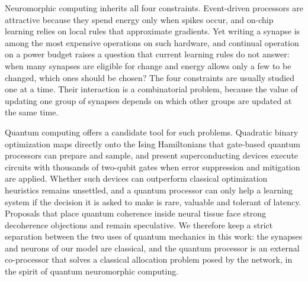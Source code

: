 \documentclass[12pt,a4paper]{article}
\begin{document}
Neuromorphic computing inherits all four constraints. Event-driven processors are attractive because they spend energy only when spikes occur\cite{roy2019,davies2018}, and on-chip learning relies on local rules that approximate gradients\cite{bellec2020,neftci2019}. Yet writing a synapse is among the most expensive operations on such hardware, and continual operation on a power budget raises a question that current learning rules do not answer: when many synapses are eligible for change and energy allows only a few to be changed, which ones should be chosen? The four constraints are usually studied one at a time. Their interaction is a combinatorial problem, because the value of updating one group of synapses depends on which other groups are updated at the same time.

Quantum computing offers a candidate tool for such problems. Quadratic binary optimization maps directly onto the Ising Hamiltonians that gate-based quantum processors can prepare and sample\cite{lucas2014,farhi2014}, and present superconducting devices execute circuits with thousands of two-qubit gates when error suppression and mitigation are applied\cite{kim2023,ibm2026}. Whether such devices can outperform classical optimization heuristics remains unsettled\cite{abbas2024,koch2026}, and a quantum processor can only help a learning system if the decision it is asked to make is rare, valuable and tolerant of latency. Proposals that place quantum coherence inside neural tissue face strong decoherence objections\cite{tegmark2000} and remain speculative\cite{fisher2015}. We therefore keep a strict separation between the two uses of quantum mechanics in this work: the synapses and neurons of our model are classical, and the quantum processor is an external co-processor that solves a classical allocation problem posed by the network, in the spirit of quantum neuromorphic computing\cite{markovic2020}.
\end{document}
